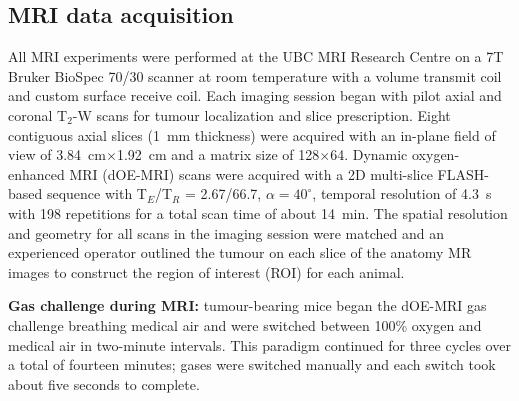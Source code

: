 \subsection{MRI data acquisition}
\label{doemri_mrianalysis1}
All MRI experiments were performed at the UBC MRI Research Centre on a 7T Bruker BioSpec 70/30 scanner at room temperature with a volume transmit coil and custom surface receive coil.
Each imaging session began with pilot axial and coronal T$_2$-W scans for tumour localization and slice prescription.
Eight contiguous axial slices (1~mm thickness) were acquired with an in-plane field of view of 3.84~cm$\times$1.92~cm and a matrix size of 128$\times$64.
Dynamic oxygen-enhanced MRI (dOE-MRI) scans were acquired with a 2D multi-slice FLASH-based sequence with T$_E$/T$_R$ = 2.67/66.7, $\alpha=40^\circ$, temporal resolution of 4.3~s with 198 repetitions for a total scan time of about 14~min.
The spatial resolution and geometry for all scans in the imaging session were matched and an experienced operator outlined the tumour on each slice of the anatomy MR images to construct the region of interest (ROI) for each animal.

\noindent\textbf{Gas challenge during MRI:} tumour-bearing mice began the \acs{dOE-MRI} gas challenge breathing medical air and were switched between 100\% oxygen and medical air in two-minute intervals.
This paradigm continued for three cycles over a total of fourteen minutes; gases were switched manually and each switch took about five seconds to complete.

